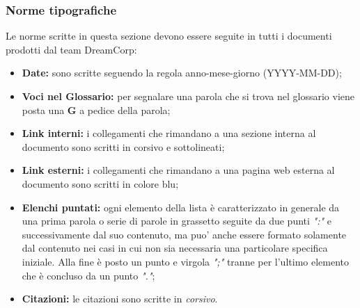 		\subsubsection{Norme tipografiche}
			Le norme scritte in questa sezione devono essere seguite in tutti i documenti prodotti dal team DreamCorp:
			\begin{itemize}
				\item \textbf{Date:} sono scritte seguendo la regola anno-mese-giorno (YYYY-MM-DD);
				\item \textbf{Voci nel Glossario:} per segnalare una parola che si trova nel glossario viene posta una \textbf{G} a pedice della parola;
				\item \textbf{Link interni:} i collegamenti che rimandano a una sezione interna al documento sono scritti in corsivo e sottolineati;
				\item \textbf{Link esterni:} i collegamenti che rimandano a una pagina web esterna al documento sono scritti in colore blu;
				\item \textbf{Elenchi puntati:} ogni elemento della lista è caratterizzato in generale da una prima parola o serie di parole in grassetto seguite da due punti \textit{":"} e successivamente dal suo contenuto, ma puo' anche essere formato solamente dal contenuto nei casi in cui non sia necessaria una particolare specifica iniziale. Alla fine è posto un punto e virgola \textit{";"} tranne per l'ultimo elemento che è concluso da un punto \textit{"."};
				\item \textbf{Citazioni:} le citazioni sono scritte in \textit{corsivo}.
			\end{itemize}
